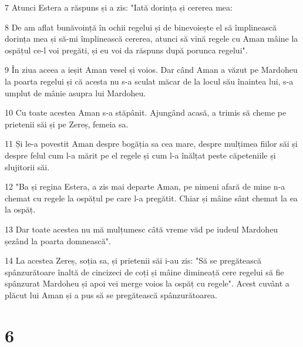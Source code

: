 \par 7 Atunci Estera a răspuns și a zis: "Iată dorința și cererea mea:
\par 8 De am aflat bunăvoință în ochii regelui și de binevoiește el să împlinească dorința mea și să-mi împlinească cererea, atunci să vină regele cu Aman mâine la ospățul ce-l voi pregăti, și eu voi da răspuns după porunca regelui".
\par 9 În ziua aceea a ieșit Aman vesel și voios. Dar când Aman a văzut pe Mardoheu la poarta regelui și că acesta nu s-a sculat măcar de la locul său înaintea lui, s-a umplut de mânie asupra lui Mardoheu.
\par 10 Cu toate acestea Aman s-a stăpânit. Ajungând acasă, a trimis să cheme pe prietenii săi și pe Zereș, femeia sa.
\par 11 Și le-a povestit Aman despre bogăția sa cea mare, despre mulțimea fiilor săi și despre felul cum l-a mărit pe el regele și cum l-a înălțat peste căpeteniile și slujitorii săi.
\par 12 "Ba și regina Estera, a zis mai departe Aman, pe nimeni afară de mine n-a chemat cu regele la ospățul pe care l-a pregătit. Chiar și mâine sânt chemat la ea la ospăț.
\par 13 Dar toate acestea nu mă mulțumesc câtă vreme văd pe iudeul Mardoheu șezând la poarta domnească".
\par 14 La acestea Zereș, soția sa, și prietenii săi i-au zis: "Să se pregătească spânzurătoare înaltă de cincizeci de coți și mâine dimineață cere regelui să fie spânzurat Mardoheu și apoi vei merge voios la ospăț cu regele". Acest cuvânt a plăcut lui Aman și a pus să se pregătească spânzurătoarea.

\chapter{6}

